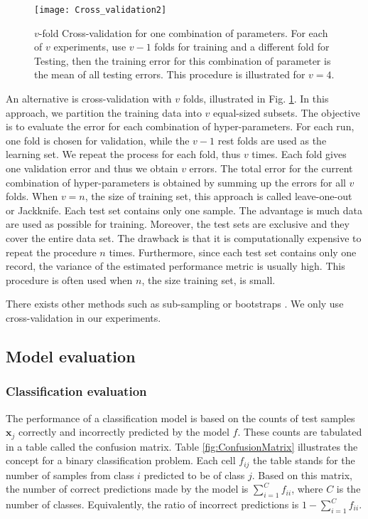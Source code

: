 \begin{figure}[h!]
	\centering
	\texttt{[image: Cross\_validation2]}
	\caption{$v$-fold Cross-validation for one combination of parameters. For each of $v$ experiments, use $v-1$ folds for training and a different fold for Testing, then the training error for this combination of parameter is the mean of all testing errors. This procedure is illustrated for $v=4$.}
	\label{fig:Cross_validation}
\end{figure}

An alternative is cross-validation with $v$ folds, illustrated in Fig. \ref{fig:Cross_validation}. In this approach, we partition the training data into $v$ equal-sized subsets. The objective is to evaluate the error for each combination of hyper-parameters. For each run, one fold is chosen for validation, while the $v-1$ rest folds are used as the learning set. We repeat the process for each fold, thus $v$ times. Each fold gives one validation error and thus we obtain $v$ errors. The total error for the current combination of hyper-parameters is obtained by summing up the errors for all $v$ folds. When $v=n$, the size of training set, this approach is called leave-one-out or Jackknife. Each test set contains only one sample. The advantage is much data are used as possible for training. Moreover, the test sets are exclusive and they cover the entire data set. The drawback is that it is computationally expensive to repeat the procedure $n$ times. Furthermore, since each test set contains only one record, the variance of the estimated performance metric is usually high. This procedure is often used when $n$, the size training set, is small.



\noindent There exists other methods such as sub-sampling or bootstraps \cite{Duda1973,Dreyfus2006}. We only use cross-validation in our experiments.

\subsection{Model evaluation}
\subsubsection{Classification evaluation}
The performance of a classification model is based on the counts of test samples $\textbf{x}_j$ correctly and incorrectly predicted by the model $f$. These counts are tabulated in a table called the confusion matrix. Table \ref{fig:ConfusionMatrix} illustrates the concept for a binary classification problem. Each cell $f_{ij}$ the table stands for the number of samples from class $i$ predicted to be of class $j$. Based on this matrix, the number of correct predictions made by the model is $\sum_{i=1}^C f_{ii}$, where $C$ is the number of classes. Equivalently, the ratio of incorrect predictions is $1-\sum_{i=1}^C f_{ii}$.

